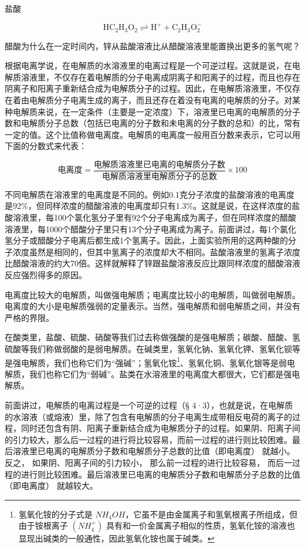 盐酸

\[
\mathrm{HC} _ {2} \mathrm{H} _ {3} \mathrm{O} _ {2} \rightleftharpoons \mathrm{H} ^ {+} + \mathrm{C} _ {2} \mathrm{H} _ {3} \mathrm{O} _ {2} ^ {-}
\]

醋酸为什么在一定时间内，锌从盐酸溶液比从醋酸溶液里能置换出更多的氢气呢？

根据电离学说，在电解质的水溶液里的电离过程是一个可逆过程。这就是说，在电解质溶液里，不仅存在着电解质的分子电离成阴离子和阳离子的过程，而且也存在阴离子和阳离子重新结合成为电解质分子的过程。因此，在电解质溶液里，不仅存在着由电解质分子电离生成的离子，而且还存在着没有电离的电解质的分子。对某种电解质来说，在一定条件（主要是一定浓度）下，溶液里已电离的电解质的分子数和电解质分子总数（包括已电离的分子数和未电离的分子数的总和）的比，常有一定的值。这个比值称做电离度。电解质的电离度一般用百分数来表示，它可以用下面的分数式来代表：

\[
\mathrm{电离度} = \frac {\mathrm{电解质溶液里已电离的电解质分子数}}{\mathrm{电解质溶液里电解质分子的总数}} \times 100
\]

不同电解质在溶液里的电离度是不同的。例如0.1克分子浓度的盐酸溶液的电离度是92\%，但同样浓度的醋酸溶液的电离度却只有1.3\%。这就是说，在这样浓度的盐酸溶液里，每100个氯化氢分子里有92个分子电离成为离子，但在同样浓度的醋酸溶液里，每1000个醋酸分子里只有13个分子电离成为离子。前面讲过，每1个氯化氢分子或醋酸分子电离后都生成1个氢离子。因此，上面实验所用的这两种酸的分子浓度虽然是相同的，但其中氢离子的浓度却大不相同。盐酸溶液里的氢离子浓度比醋酸溶液的约大70倍。这样就解释了锌跟盐酸溶液反应比跟同样浓度的醋酸溶液反应强烈得多的原因。

电离度比较大的电解质，叫做强电解质；电离度比较小的电解质，叫做弱电解质。电离度的大小是电解质强弱的定量表示。当然，强电解质和弱电解质之间，并没有严格的界限。

在酸类里，盐酸、硫酸、硝酸等我们过去称做强酸的是强电解质；碳酸、醋酸、氢硫酸等我们称做弱酸的是弱电解质。在碱类里，氢氧化钠、氢氧化钾、氢氧化钡等是强电解质，我们也称它们为``强碱''；氢氧化铵\footnote{氢氧化铵的分子式是
  \(NH_{4}OH\)，它虽不是由金属离子和氢氧根离子所组成，但由于铵根离子
  \((NH_{4}^{+})\)
  具有和一价金属离子相似的性质，氢氧化铵的溶液也显现出碱类的一般通性，因此氢氧化铵也属于碱类。}、氢氧化铜、氢氧化银等是弱电解质，我们也称它们为``弱碱''。盐类在水溶液里的电离度大都很大，它们都是强电解质。

前面讲过，电解质的电离过程是一个可逆的过程（§
4·3），也就是说，在电解质的水溶液（或熔液）里，除了包含有电解质的分子电离生成带相反电荷的离子的过程，同时还包含有阴、阳离子重新结合成为电解质分子的过程。如果阴、阳离子间的引力较大，那么后一过程的进行将比较容易，而前一过程的进行则比较困难。最后溶液里已电离的电解质分子数和电解质分子总数的比值（即电离度）
就越小。反之， 如果阴、阳离子间的引力较小， 那么前一过程的进行比较容易，
而后一过程的进行则比较困难。最后溶液里已电离的电解质分子数和电解质分子总数的比值
（即电离度） 就越较大。

